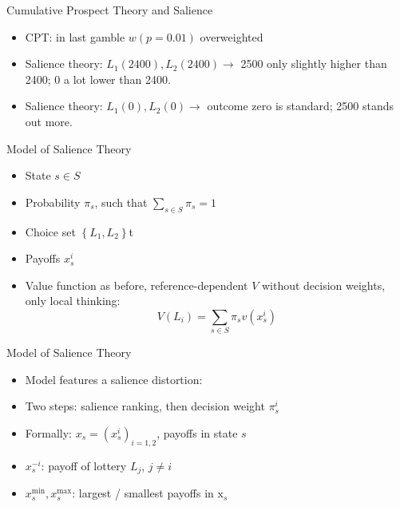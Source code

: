 \documentclass[11pt, aspectratio=169]{beamer}
\begin{document}
\begin{frame}{Cumulative Prospect Theory and Salience}
\begin{itemize}
    \item CPT: in last gamble $w(p=0.01)$ overweighted\medskip
    \item Salience theory: $L_1(2400),L_2(2400) \rightarrow$ 2500 only slightly higher than 2400; 0 a lot lower than 2400.\medskip
    \item Salience theory: $L_1(0),L_2(0) \rightarrow$ outcome zero is standard; 2500 stands out more.\medskip
\end{itemize}
\end{frame}

\begin{frame}{Model of Salience Theory}
    \begin{itemize}
        \item State $s \in S$\medskip
        \item Probability $\pi_s$, such that $\sum_{s \in S} \pi_s=1$\medskip
        \item Choice set $\left\{L_1, L_2\right\}$t\medskip
        \item Payoffs $x_s^i$\medskip
        \item Value function as before, reference-dependent $V$ without decision weights, only local thinking:
        \[    V\left(L_i\right)=\sum_{s \in S} \pi_s v\left(x_s^i\right)\]
     	\end{itemize}
\end{frame}

\begin{frame}{Model of Salience Theory}
    \begin{itemize}
	\item Model features a salience distortion:\medskip
        \item Two steps: salience ranking, then decision weight $\pi_s^i$\medskip
        \item Formally: $x_s=\left(x_s^i\right)_{i=1,2}$, payoffs in state $s$\medskip
        \item $x_s^{-i}$: payoff of lottery $L_j$, $j \neq i$\medskip
        \item $x_s^{\min }, x_s^{\max }$: largest / smallest payoffs in $\mathrm{x}_s$
	\end{itemize}
\end{frame}
\end{document}
